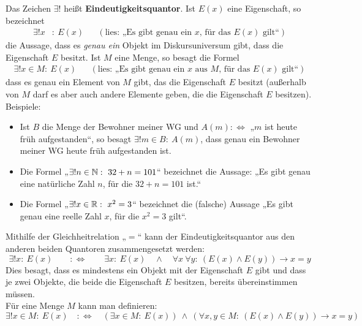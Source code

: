 \begin{de}[Eindeutigkeitsquantor]
 Das Zeichen $\exists !$ heißt \textbf{Eindeutigkeitsquantor}. Ist $E(x)$ eine Eigenschaft, so bezeichnet
 \begin{align*}
   \exists ! x& :\ E(x) && (\text{lies: „Es gibt genau ein $x$, für das $E(x)$ gilt“})
 \end{align*}
 die Aussage, dass es \emph{genau ein} Objekt im Diskursuniversum gibt, dass die Eigenschaft $E$ besitzt. Ist $M$ eine Menge, so besagt die Formel
 \begin{align*}
  \exists ! x\in M :\ E(x)  &&(\text{lies: „Es gibt genau ein $x$ aus $M$, für das $E(x)$ gilt“})
 \end{align*}
dass es genau ein Element von $M$ gibt, das die Eigenschaft $E$ besitzt (außerhalb von $M$ darf es aber auch andere Elemente geben, die die Eigenschaft $E$ besitzen). Beispiele:
 \begin{itemize}
  \item Ist $B$ die Menge der Bewohner meiner WG und $A(m):\Leftrightarrow$ „$m$ ist heute früh aufgestanden“, so besagt $\exists ! m\in B:\ A(m)$, dass genau ein Bewohner meiner WG heute früh aufgestanden ist.
  \item Die Formel „$\exists ! n\in {\mathbb N} :\ 32+n = 101$“ bezeichnet die Aussage: „Es gibt genau eine natürliche Zahl $n$, für die $32+n=101$ ist.“
  \item Die Formel „$\exists ! x\in \Rz:\ x^2=3$“ bezeichnet die (falsche) Aussage „Es gibt genau eine reelle Zahl $x$, für die $x^2=3$ gilt“.
 \end{itemize}
\end{de}




\begin{bem} \label{zerlegung des eindeutigkeitsquantors}
 Mithilfe der Gleichheitrelation „$=$“ kann der Eindeutigkeitsquantor aus den anderen beiden Quantoren zusammengesetzt werden:
 \[ \exists ! x:\ E(x)\qquad :\Leftrightarrow\qquad \exists x:\ E(x) \quad \land\quad \forall x\ \forall y:\ (E(x)\land E(y)) \to x=y \]
Dies besagt, dass es mindestens ein Objekt mit der Eigenschaft $E$ gibt und dass je zwei Objekte, die beide die Eigenschaft $E$ besitzen, bereits übereinstimmen müssen. \\
Für eine Menge $M$ kann man definieren:
 \[ \exists ! x\in M:\ E(x)\quad :\Leftrightarrow\quad (\exists x\in M:\ E(x))\ \land\ (\forall x,y\in M:\ (E(x)\land E(y)) \to x=y) \]
\end{bem}


